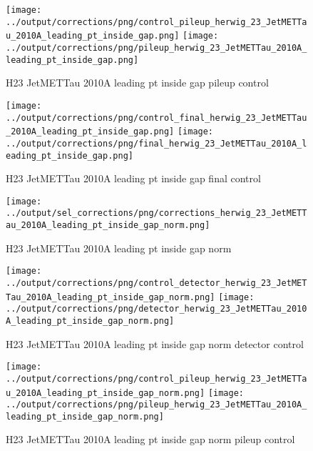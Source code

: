 \documentclass[11pt]{book}
\begin{document}
\begin{figure}[ht]
\centering
\texttt{[image: ../output/corrections/png/control\_pileup\_herwig\_23\_JetMETTau\_2010A\_leading\_pt\_inside\_gap.png]}
\texttt{[image: ../output/corrections/png/pileup\_herwig\_23\_JetMETTau\_2010A\_leading\_pt\_inside\_gap.png]}
\caption{H23 JetMETTau 2010A leading pt inside gap pileup control}
\label{fig:H23_JetMETTau_2010A_leading_pt_inside_gap_pileup_control}
\end{figure}


\begin{figure}[ht]
\centering
\texttt{[image: ../output/corrections/png/control\_final\_herwig\_23\_JetMETTau\_2010A\_leading\_pt\_inside\_gap.png]}
\texttt{[image: ../output/corrections/png/final\_herwig\_23\_JetMETTau\_2010A\_leading\_pt\_inside\_gap.png]}
\caption{H23 JetMETTau 2010A leading pt inside gap final control}
\label{fig:H23_JetMETTau_2010A_leading_pt_inside_gap_final_control}
\end{figure}



\begin{figure}[ht]
\centering
\texttt{[image: ../output/sel\_corrections/png/corrections\_herwig\_23\_JetMETTau\_2010A\_leading\_pt\_inside\_gap\_norm.png]}
\caption{H23 JetMETTau 2010A leading pt inside gap norm}
\label{fig:H23_JetMETTau_2010A_leading_pt_inside_gap_norm}
\end{figure}

\begin{figure}[ht]
\centering
\texttt{[image: ../output/corrections/png/control\_detector\_herwig\_23\_JetMETTau\_2010A\_leading\_pt\_inside\_gap\_norm.png]}
\texttt{[image: ../output/corrections/png/detector\_herwig\_23\_JetMETTau\_2010A\_leading\_pt\_inside\_gap\_norm.png]}
\caption{H23 JetMETTau 2010A leading pt inside gap norm detector control}
\label{fig:H23_JetMETTau_2010A_leading_pt_inside_gap_norm_detector_control}
\end{figure}

\begin{figure}[ht]
\centering
\texttt{[image: ../output/corrections/png/control\_pileup\_herwig\_23\_JetMETTau\_2010A\_leading\_pt\_inside\_gap\_norm.png]}
\texttt{[image: ../output/corrections/png/pileup\_herwig\_23\_JetMETTau\_2010A\_leading\_pt\_inside\_gap\_norm.png]}
\caption{H23 JetMETTau 2010A leading pt inside gap norm pileup control}
\label{fig:H23_JetMETTau_2010A_leading_pt_inside_gap_norm_pileup_control}
\end{figure}
\end{document}
